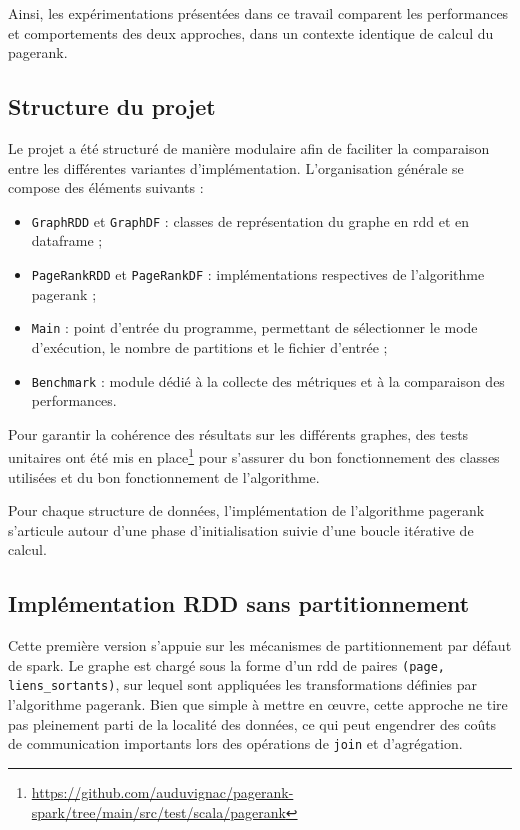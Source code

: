 \documentclass[conference]{IEEEtran}
\begin{document}
Ainsi, les expérimentations présentées dans ce travail comparent les performances et comportements des deux approches, dans un contexte identique de calcul du \gls{pagerank}.

\subsection{Structure du projet}

Le projet a été structuré de manière modulaire afin de faciliter la comparaison entre les différentes variantes d'implémentation.  
L'organisation générale se compose des éléments suivants :
\begin{itemize}
    \item \texttt{GraphRDD} et \texttt{GraphDF} : classes de représentation du graphe en \gls{rdd} et en \gls{dataframe} ;
    \item \texttt{PageRankRDD} et \texttt{PageRankDF} : implémentations respectives de l'algorithme \gls{pagerank} ;
    \item \texttt{Main} : point d'entrée du programme, permettant de sélectionner le mode d'exécution, le nombre de partitions et le fichier d'entrée ;
    \item \texttt{Benchmark} : module dédié à la collecte des métriques et à la comparaison des performances.
\end{itemize}

Pour garantir la cohérence des résultats sur les différents graphes, des tests unitaires ont été mis en place\footnote{\url{https://github.com/auduvignac/pagerank-spark/tree/main/src/test/scala/pagerank}} pour s'assurer du bon fonctionnement des classes utilisées et du bon fonctionnement de l'algorithme.

Pour chaque structure de données, l'implémentation de l'algorithme \gls{pagerank} s'articule autour d'une phase d'initialisation suivie d'une boucle itérative de calcul.

\subsection{Implémentation RDD sans partitionnement}\label{subsection:RDD sans partitionnement}

Cette première version s'appuie sur les mécanismes de partitionnement par défaut de \gls{spark}.  
Le graphe est chargé sous la forme d'un \gls{rdd} de paires \texttt{(page, liens\_sortants)}, sur lequel sont appliquées les transformations définies par l'algorithme \gls{pagerank}.  
Bien que simple à mettre en œuvre, cette approche ne tire pas pleinement parti de la localité des données, ce qui peut engendrer des coûts de communication importants lors des opérations de \texttt{join} et d'agrégation.
\end{document}
